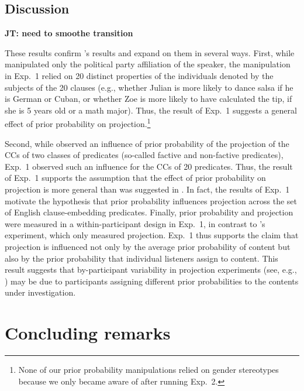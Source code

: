 \documentclass[11pt,fleqn]{article}
\newcommand{\jt}[1]{\textbf{\color{blue}JT: #1}}
\newcommand{\6}{\mbox{$[\hspace*{-.6mm}[$}}
\newcommand{\9}{\mbox{$]\hspace*{-.6mm}]$}}
\newcommand{\citepos}[1]{\citeauthor{#1}'s \citeyear{#1}}
\newcommand{\citeposs}[1]{\citeauthor{#1}'s}
\begin{document}

\subsection{Discussion}

\jt{need to smoothe transition}

These results confirm \citepos{mahler2020} results and expand on them in several ways. First, while  manipulated only the political party affiliation of the speaker, the manipulation in Exp.~1 relied on 20 distinct properties of the individuals denoted by the subjects of the 20 clauses (e.g., whether Julian is more likely to dance salsa if he is German or Cuban, or whether Zoe is more likely to have calculated the tip, if she is 5 years old or a math major). Thus, the result of Exp.~1 suggests a general effect of prior probability on projection.\footnote{None of our prior probability manipulations relied on gender stereotypes because we only became aware of  after running Exp.~2.}

Second, while  observed an influence of prior probability of the projection of the CCs of two classes of predicates (so-called factive and non-factive predicates), Exp.~1 observed such an influence for the CCs of 20 predicates. Thus, the result of Exp.~1 supports the assumption that the effect of prior probability on projection is more general than was suggested in . In fact, the results of Exp.~1 motivate the hypothesis that prior probability influences projection across the set of English clause-embedding predicates. Finally, prior probability and projection were measured in a within-participant design in Exp.~1, in contrast to \citeposs{mahler2020} experiment, which only measured projection.  Exp.~1 thus supports the claim that projection is influenced not only by the average prior probability of content but also by the prior probability that individual listeners assign to content. This result suggests that by-participant variability in projection experiments (see, e.g., ) may be due to participants assigning different prior probabilities to the contents under investigation. 

\section{Concluding remarks}\label{s4}
\end{document}
